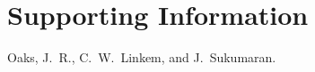 \documentclass[letterpaper,12pt]{article}
\makeatletter
\let\msTitle\@title
\makeatother
\begin{document}

\newpage
\singlespacing



\clearpage

\newpage



\setcounter{figure}{0}
\setcounter{table}{0}
\setcounter{page}{1}
\setcounter{section}{0}

\singlespacing

\section*{Supporting Information}
\hangindent=1cm
Oaks, J.~R., C.~W.\ Linkem, and J.~Sukumaran. \msTitle



\newpage
\singlespacing


\end{document}
